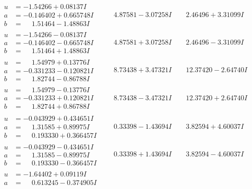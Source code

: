 \documentclass[1p]{elsarticle_modified}
\theoremstyle{definition}
\begin{document}
$$\begin{array}{c|c|c}
\begin{aligned}
u &= -1.54266 + 0.08137 I \\
a &= -0.146402 + 0.665748 I \\
b &= \phantom{-}1.51464 - 1.48863 I\end{aligned}
 & \phantom{-}4.87581 - 3.07258 I & \phantom{-}2.46496 + 3.31099 I \\ \hline\begin{aligned}
u &= -1.54266 - 0.08137 I \\
a &= -0.146402 - 0.665748 I \\
b &= \phantom{-}1.51464 + 1.48863 I\end{aligned}
 & \phantom{-}4.87581 + 3.07258 I & \phantom{-}2.46496 - 3.31099 I \\ \hline\begin{aligned}
u &= \phantom{-}1.54979 + 0.13776 I \\
a &= -0.331233 - 0.120821 I \\
b &= \phantom{-}1.82744 - 0.86788 I\end{aligned}
 & \phantom{-}8.73438 + 3.47321 I & \phantom{-}12.37420 - 2.64740 I \\ \hline\begin{aligned}
u &= \phantom{-}1.54979 - 0.13776 I \\
a &= -0.331233 + 0.120821 I \\
b &= \phantom{-}1.82744 + 0.86788 I\end{aligned}
 & \phantom{-}8.73438 - 3.47321 I & \phantom{-}12.37420 + 2.64740 I \\ \hline\begin{aligned}
u &= -0.043929 + 0.434651 I \\
a &= \phantom{-}1.31585 + 0.89975 I \\
b &= \phantom{-}0.193330 + 0.366457 I\end{aligned}
 & \phantom{-}0.33398 - 1.43694 I & \phantom{-}3.82594 + 4.60037 I \\ \hline\begin{aligned}
u &= -0.043929 - 0.434651 I \\
a &= \phantom{-}1.31585 - 0.89975 I \\
b &= \phantom{-}0.193330 - 0.366457 I\end{aligned}
 & \phantom{-}0.33398 + 1.43694 I & \phantom{-}3.82594 - 4.60037 I \\ \hline\begin{aligned}
u &= -1.64402 + 0.09119 I \\
a &= \phantom{-}0.613245 - 0.374905 I \\

\end{aligned}
\end{array}$$
\end{document}
